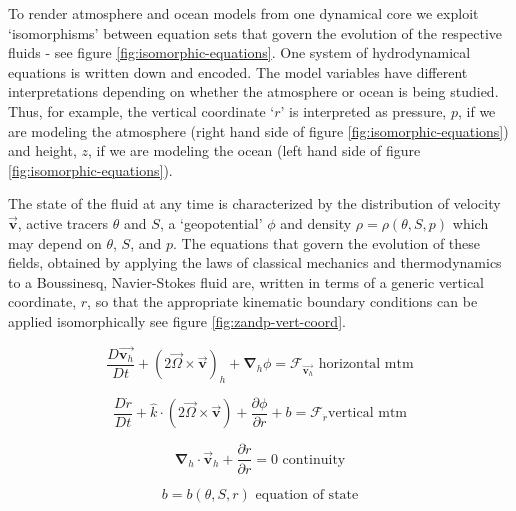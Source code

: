 To render atmosphere and ocean models from one dynamical core we exploit
`isomorphisms' between equation sets that govern the evolution of the
respective fluids - see figure \ref{fig:isomorphic-equations}. 
One system of hydrodynamical equations is written down
and encoded. The model variables have different interpretations depending on
whether the atmosphere or ocean is being studied. Thus, for example, the
vertical coordinate `$r$' is interpreted as pressure, $p$, if we are
modeling the atmosphere (right hand side of figure \ref{fig:isomorphic-equations})
and height, $z$, if we are modeling the ocean (left hand side of figure
\ref{fig:isomorphic-equations}).



The state of the fluid at any time is characterized by the distribution of
velocity $\vec{\mathbf{v}}$, active tracers $\theta $ and $S$, a
`geopotential' $\phi $ and density $\rho =\rho (\theta ,S,p)$ which may
depend on $\theta $, $S$, and $p$. The equations that govern the evolution
of these fields, obtained by applying the laws of classical mechanics and
thermodynamics to a Boussinesq, Navier-Stokes fluid are, written in terms of
a generic vertical coordinate, $r$, so that the appropriate
kinematic boundary conditions can be applied isomorphically
see figure \ref{fig:zandp-vert-coord}.



\begin{equation}
\frac{D\vec{\mathbf{v}_{h}}}{Dt}+\left( 2\vec{\Omega}\times \vec{\mathbf{v}}
\right) _{h}+\mathbf{\nabla }_{h}\phi =\mathcal{F}_{\vec{\mathbf{v}_{h}}}
\text{ horizontal mtm} \label{eq:horizontal_mtm}
\end{equation}

\begin{equation}
\frac{D\dot{r}}{Dt}+\widehat{k}\cdot \left( 2\vec{\Omega}\times \vec{\mathbf{
v}}\right) +\frac{\partial \phi }{\partial r}+b=\mathcal{F}_{\dot{r}}\text{
vertical mtm} \label{eq:vertical_mtm}
\end{equation}

\begin{equation}
\mathbf{\nabla }_{h}\cdot \vec{\mathbf{v}}_{h}+\frac{\partial \dot{r}}{
\partial r}=0\text{ continuity}  \label{eq:continuity}
\end{equation}

\begin{equation}
b=b(\theta ,S,r)\text{ equation of state} \label{eq:equation_of_state}
\end{equation}

